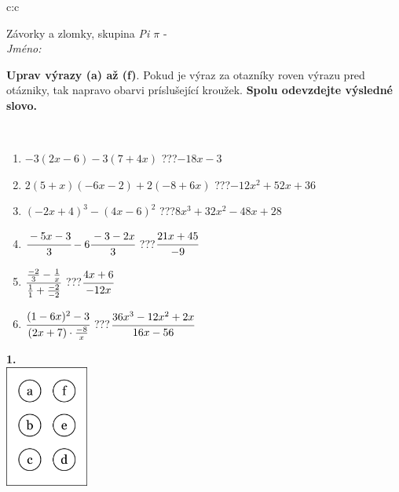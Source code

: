 \documentclass[10pt]{report}
\begin{document}
\begin{tabular}{c:c}
\begin{minipage}[c][104.5mm][t]{0.5\linewidth}
\begin{center}
\vspace{7mm}
{\huge Závorky a zlomky, skupina \textit{Pi $\pi$} -}\\[5mm]
\textit{Jméno:}\phantom{xxxxxxxxxxxxxxxxxxxxxxxxxxxxxxxxxxxxxxxxxxxxxxxxxxxxxxxxxxxxxxxxx}\\[5mm]
\begin{minipage}{0.95\linewidth}
\begin{center}
\textbf{Uprav výrazy (a) až (f)}. Pokud je výraz za otazníky roven výrazu pred otázniky, tak napravo obarvi príslušející kroužek. \textbf{Spolu odevzdejte výsledné slovo.}
\end{center}
\end{minipage}
\\[1mm]
\begin{minipage}{0.79\linewidth}
\begin{center}
\begin{varwidth}{\linewidth}
\begin{enumerate}
\normalsize
\item $-3(2x-6)-3(7+4x)$\quad \dotfill\; ???\;\dotfill \quad $-18x-3$
\item $2(5+x)(-6x-2)+2(-8+6x)$\quad \dotfill\; ???\;\dotfill \quad $-12x^2+52x+36$
\item $(-2x+4)^3-(4x-6)^2$\quad \dotfill\; ???\;\dotfill \quad $8x^3+32x^2-48x+28$
\item $\cfrac{-5x-3}{3}-6\cfrac{-3-2x}{3}$\quad \dotfill\; ???\;\dotfill \quad $\cfrac{21x+45}{-9}$
\item $\cfrac{\frac{-2}{3}-\frac{1}{x}}{\frac{1}{1}+\frac{-2}{-2}}$\quad \dotfill\; ???\;\dotfill \quad $\cfrac{4x+6}{-12x}$
\item $\cfrac{(1-6x)^2-3}{(2x+7)\cdot\frac{-8}{x}}$\quad \dotfill\; ???\;\dotfill \quad $\cfrac{36x^3-12x^2+2x}{16x-56}$
\end{enumerate}
\end{varwidth}
\end{center}
\end{minipage}
\begin{minipage}{0.20\linewidth}
\begin{center}
{\Huge\bfseries 1.} \\[2mm]
\includegraphics[height=40mm]{../images/braille.png}

\end{center}
\end{minipage}
\end{center}
\end{minipage}
\end{tabular}
\end{document}

